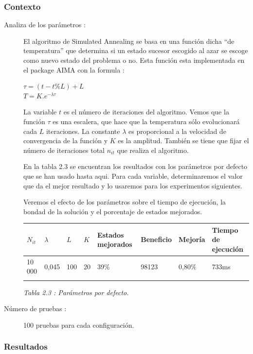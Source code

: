 \documentclass{article}
\begin{document}
\subsubsection{Contexto}
\begin{description}
\item[Analiza de los parámetros :] El algoritmo de Simulated Annealing se basa
en una función dicha ``de temperatura'' que determina si un estado sucesor
escogido al azar se escoge como nuevo estado del problema o no. Esta función
esta implementada en el package AIMA con la formula :
\begin{center}
$\tau = (t-t\%L)+L$\\
$T = K.e^{-\lambda \tau}$
\end{center}
La variable $t$ es el número de iteraciones del algoritmo. Vemos que la función
$\tau$ es una escalera, que hace que la temperatura sólo evolucionará cada $L$
iteraciones. La constante $\lambda$ es proporcional a la velocidad de
convergencia de la función y $K$ es la amplitud. También se tiene que fijar el
número de iteraciones total $n_{it}$ que realiza el algoritmo.

En la tabla 2.3 se encuentran los resultados con los parámetros por defecto que
se han usado hasta aqui. Para cada variable, determinaremos el valor que da el
mejor resultado y lo usaremos para los experimentos siguientes.

Veremos el efecto de los parámetros sobre el tiempo de ejecución, la bondad de
la solución y el porcentaje de estados mejorados.

\begin{center}
\begin{tabular}{|l|l|l|l||l|l|l|l|}
\hline
$N_{it}$ & $\lambda$ & $L$ & $K$ & Estados mejorados & Beneficio & Mejoría & 
Tiempo de ejecución\\
\hline
10 000 & 0,045 & 100 & 20 & 39\% & 98123 & 0,80\% & 733ms\\
\hline\\
\end{tabular}
{\it Tabla 2.3 : Parámetros por defecto.}
\end{center}
\item[Número de pruebas :] 100 pruebas para cada configuración.
\end{description}

\subsubsection{Resultados}
\end{document}
